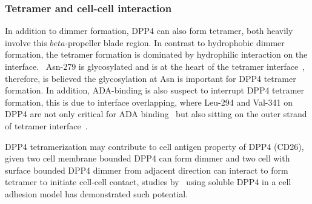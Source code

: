 \subsubsection{Tetramer and cell-cell interaction}

In addition to dimmer formation, DPP4 can also form tetramer, both heavily involve this $beta$-propeller blade region. In contrast to hydrophobic dimmer formation, the tetramer formation is dominated by hydrophilic interaction on the interface.~\cite{Engel_2003} Asn-279 is glycosylated and is at the heart of the tetramer interface~\cite{Engel_2003}, therefore, is believed the glycosylation at Asn is important for DPP4 tetramer formation. In addition, ADA-binding is also suspect to interrupt DPP4 tetramer formation, this is due to interface overlapping, where Leu-294 and Val-341 on DPP4 are not only critical for ADA binding~\cite{Abbott_1999} but also sitting on the outer strand of tetramer interface~\cite{Engel_2003}.   
\par 
DPP4 tetramerization may contribute to cell antigen property of DPP4 (CD26), given two cell membrane bounded DPP4 can form dimmer and two cell with surface bounded DPP4 dimmer from adjacent direction can interact to form tetramer to initiate cell-cell contact, studies by~\citet{Cheng1998,Abdel-Ghany1998} using soluble DPP4 in a cell adhesion model has demonstrated such potential. 